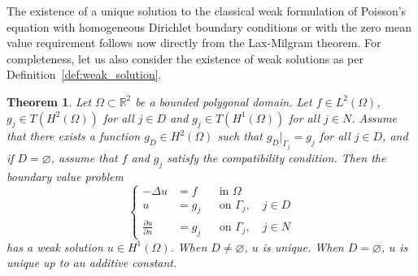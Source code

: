 \documentclass[english, 12pt, a4paper, sci, utf8, a-2b, online]{aaltothesis}
\theoremstyle{definition}
\theoremstyle{plain}
\newtheorem{theorem}{Theorem}[section]
\numberwithin{equation}{section}
\begin{document}
The existence of a unique solution to the classical weak formulation of Poisson's equation
with homogeneous Dirichlet boundary conditions or with the zero mean value requirement
follows now directly from the Lax-Milgram theorem.
For completeness, let us also consider the existence of weak solutions
as per Definition~\ref{def:weak_solution}.
\begin{theorem}
    \label{thm:weak_poisson_is_solvable}
    Let $\Omega \subset \mathbb{R}^2$ be a bounded polygonal domain.
    Let $f \in L^2(\Omega)$, $g_j \in T(H^2(\Omega))$ for all $j \in D$
    and $g_j \in T(H^1(\Omega))$ for all $j \in N$.
    Assume that there exists a function $g_D \in H^2(\Omega)$ such that
    $g_D|_{\Gamma_j} = g_j$ for all $j \in D$, and if $D = \varnothing$,
    assume that $f$ and $g_j$ satisfy the compatibility condition.
    Then the boundary value problem
    \begin{equation*}
        \left\{
            \begin{aligned}
                -\Delta u &= f && \text{in } \Omega \\
                u &= g_j && \text{on } \Gamma_j, \quad j \in D \\
                \frac{\partial u}{\partial n} &= g_j && \text{on } \Gamma_j,
                \quad j \in N
            \end{aligned}
        \right.
    \end{equation*}
    has a weak solution $u \in H^1(\Omega)$.
    When $D \neq \varnothing$, $u$ is unique.
    When $D = \varnothing$, $u$ is unique up to an additive constant.
\end{theorem}
\end{document}
